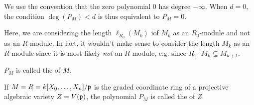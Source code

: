 \documentclass[a4paper,parskip=half,numbers=enddot, DIV=12]{scrreprt}
\begin{document}
\begin{rem*}
	\begin{alphanumerate}
		\item 
		We use the convention that the zero polynomial 0 has degree $-\infty$. When $d=0$, the condition $\deg(P_M) <d$ is thus equivalent to $P_M = 0$.
		\item  Here, we are considering the length $\ell_{R_0}(M_k)$ iof $M_k$ as an $R_0$-module and not as an $R$-module. In fact, it wouldn't make sense to consider the length $M_k$ as an $R$-module since it is most likely \emph{not} an $R$-module, e.g. since $R_1\cdot M_k\subseteq M_{k+1}$.
	\end{alphanumerate}
\end{rem*}
\begin{defi}
    $P_M$ is called the  of $M$.
\end{defi}
\begin{defi} 
    If $M=R=k[X_0,\ldots, X_n]/\mathfrak{p}$ is the graded coordinate ring of a projective algebraic variety $Z=V(\mathfrak{p})$, the polynomial $P_M$ is called the  of $Z$.
\end{defi}
\end{document}
